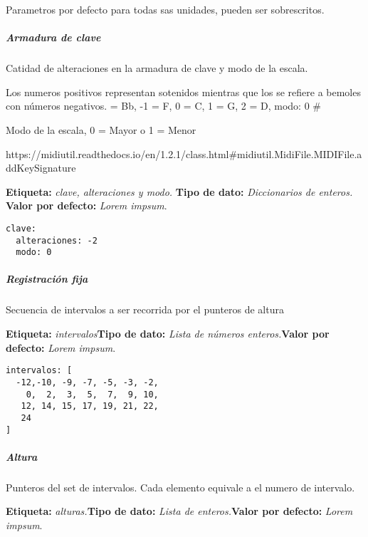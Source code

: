 \documentclass[]{article}
\let\oldsubparagraph\subparagraph
\renewcommand{\subparagraph}[1]{\oldsubparagraph{#1}\mbox{}}
\begin{document}
Parametros por defecto para todas sas unidades, pueden ser sobrescritos.

\hypertarget{armadura-de-clave}{%
\subparagraph{Armadura de clave}\label{armadura-de-clave}}

Catidad de alteraciones en la armadura de clave y modo de la escala.

Los numeros positivos representan sotenidos mientras que los se refiere
a bemoles con números negativos. = Bb, -1 = F, 0 = C, 1 = G,
2 = D, modo: 0 \#

Modo de la escala, 0 = Mayor o 1 = Menor

https://midiutil.readthedocs.io/en/1.2.1/class.html\#midiutil.MidiFile.MIDIFile.addKeySignature

\textbf{Etiqueta:} \emph{clave, alteraciones y modo.}\newline
\textbf{Tipo de dato:} \emph{Diccionarios de enteros.}\newline
\textbf{Valor por defecto:} \emph{Lorem impsum}.\newline

\begin{verbatim}
clave:
  alteraciones: -2
  modo: 0 
\end{verbatim}

\hypertarget{registraciuxf3n-fija}{%
\subparagraph{Registración fija}\label{registraciuxf3n-fija}}

Secuencia de intervalos a ser recorrida por el punteros de altura

\textbf{Etiqueta:} \emph{intervalos}\newline \textbf{Tipo de dato:}
\emph{Lista de números enteros.}\newline \textbf{Valor por defecto:}
\emph{Lorem impsum}.\newline

\begin{verbatim}
intervalos: [ 
  -12,-10, -9, -7, -5, -3, -2,
    0,  2,  3,  5,  7,  9, 10,
   12, 14, 15, 17, 19, 21, 22,
   24
]
\end{verbatim}

\hypertarget{altura}{%
\subparagraph{Altura}\label{altura}}

Punteros del set de intervalos. Cada elemento equivale a el numero de
intervalo.

\textbf{Etiqueta:} \emph{alturas.}\newline \textbf{Tipo de dato:}
\emph{Lista de enteros.}\newline \textbf{Valor por defecto:} \emph{Lorem
impsum}.\newline
\end{document}
